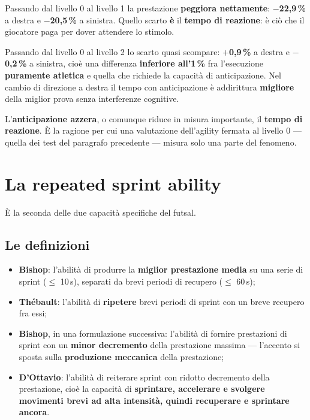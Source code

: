 Passando dal livello 0 al livello 1 la prestazione \textbf{peggiora nettamente}:
\textbf{$-$22,9\,\%} a destra e \textbf{$-$20,5\,\%} a sinistra. Quello scarto \textbf{è} il
\textbf{tempo di reazione}: è ciò che il giocatore paga per dover attendere lo stimolo.

Passando dal livello 0 al livello 2 lo scarto quasi scompare: \textbf{$+$0,9\,\%} a destra e
\textbf{$-$0,2\,\%} a sinistra, cioè una differenza \textbf{inferiore all'1\,\%} fra l'esecuzione
\textbf{puramente atletica} e quella che richiede la capacità di anticipazione. Nel cambio di
direzione a destra il tempo con anticipazione è addirittura \textbf{migliore} della miglior prova
senza interferenze cognitive.

L'\textbf{anticipazione azzera}, o comunque riduce in misura importante, il \textbf{tempo di
reazione}. È la ragione per cui una valutazione dell'agility fermata al livello 0 --- quella dei
test del paragrafo precedente --- misura solo una parte del fenomeno.

\section{La repeated sprint ability}

È la seconda delle due capacità specifiche del futsal.

\subsection{Le definizioni}

\begin{itemize}
  \item \textbf{Bishop}: l'abilità di produrre la \textbf{miglior prestazione media} su una serie
    di sprint ($\leq$ 10\,s), separati da brevi periodi di recupero ($\leq$ 60\,s);
  \item \textbf{Thébault}: l'abilità di \textbf{ripetere} brevi periodi di sprint con un breve
    recupero fra essi;
  \item \textbf{Bishop}, in una formulazione successiva: l'abilità di fornire prestazioni di
    sprint con un \textbf{minor decremento} della prestazione massima --- l'accento si sposta
    sulla \textbf{produzione meccanica} della prestazione;
  \item \textbf{D'Ottavio}: l'abilità di reiterare sprint con ridotto decremento della
    prestazione, cioè la capacità di \textbf{sprintare, accelerare e svolgere movimenti brevi ad
    alta intensità, quindi recuperare e sprintare ancora}.
\end{itemize}

